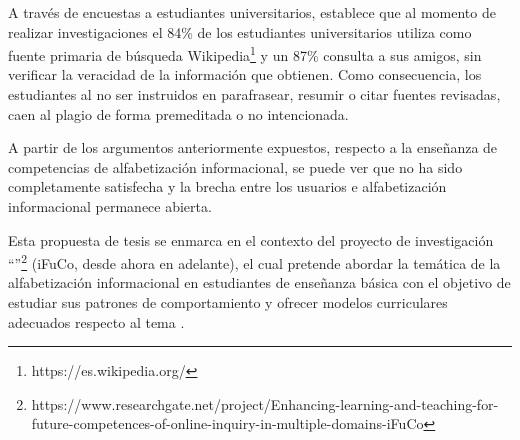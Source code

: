 A través de encuestas a estudiantes universitarios, \textcite[p.~475]{head2013project} establece que al momento de realizar investigaciones el 84\% de los estudiantes universitarios utiliza como fuente primaria de búsqueda Wikipedia\footnote{https://es.wikipedia.org/} y un 87\% consulta a sus amigos, sin verificar la veracidad de la información que obtienen. Como consecuencia, los estudiantes al no ser instruidos en parafrasear, resumir o citar fuentes revisadas, caen al plagio de forma premeditada o no intencionada. 

A partir de los argumentos anteriormente expuestos, respecto a la enseñanza de competencias de alfabetización informacional, se puede ver que no ha sido completamente satisfecha y la brecha entre los usuarios e alfabetización informacional permanece abierta.

Esta propuesta de tesis se enmarca en el contexto del proyecto de investigación “”\footnote{https://www.researchgate.net/project/Enhancing-learning-and-teaching-for-future-competences-of-online-inquiry-in-multiple-domains-iFuCo} (iFuCo, desde ahora en adelante), el cual pretende abordar la temática de la alfabetización informacional en estudiantes de enseñanza básica con el objetivo de estudiar sus patrones de comportamiento y ofrecer modelos curriculares adecuados respecto al tema \parencite{sormen2017performance}.